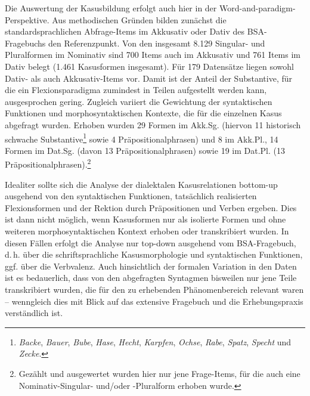 \begin{sloppypar}
Die Auswertung der Kasusbildung erfolgt auch hier in der Word-and-par\-a\-digm-Per\-spek\-ti\-ve. Aus methodischen Gründen bilden zunächst die standardsprachlichen Abfrage-Items im Akkusativ oder Dativ des BSA-Fragebuchs den Referenzpunkt. Von den insgesamt 8.129 Singular- und Pluralformen im Nominativ sind 700 Items auch im Akkusativ und 761 Items im Dativ belegt (1.461 Kasusformen insgesamt). Für 179 Datensätze liegen sowohl Dativ- als auch Akkusativ-Items vor. Damit ist der Anteil der Substantive, für die ein Flexionsparadigma zumindest in Teilen aufgestellt werden kann, ausgesprochen gering. Zugleich variiert die Gewichtung der syntaktischen Funktionen und morphosyntaktischen Kontexte, die für die einzelnen Kasus abgefragt wurden. Erhoben wurden 29 Formen im Akk.Sg. (hiervon 11 historisch schwache Substantive\footnote{\textit{Backe}, \textit{Bauer}, \textit{Bube}, \textit{Hase}, \textit{Hecht}, \textit{Karpfen}, \textit{Ochse}, \textit{Rabe}, \textit{Spatz}, \textit{Specht} und \textit{Zecke}.} sowie 4 Präpositionalphrasen) und 8 im Akk.Pl., 14 Formen im Dat.Sg. (davon 13 Präpositionalphrasen) sowie 19 im Dat.Pl. (13 Präpositionalphrasen).\footnote{Gezählt und ausgewertet wurden hier nur jene Frage-Items, für die auch eine Nominativ-Singular- und/oder
{}-Pluralform erhoben wurde.}
\end{sloppypar}

\begin{sloppypar}
Idealiter sollte sich die Analyse der dialektalen Kasusrelationen bottom-up ausgehend von den syntaktischen Funktionen, tatsächlich realisierten Flexionsformen und der Rektion durch Präpositionen und Verben ergeben. Dies ist dann nicht möglich, wenn Kasusformen nur als isolierte Formen und ohne weiteren morphosyntaktischen Kontext erhoben oder trans\-kri\-biert wurden. In diesen Fällen erfolgt die Analyse nur top-down ausgehend vom BSA-Fragebuch, d.\,h. über die schriftsprachliche Kasusmorphologie und syntaktischen Funktionen, ggf. über die Verb\-va\-lenz. Auch hinsichtlich der formalen Variation in den Daten ist es bedauerlich, dass von den abgefragten Syntagmen bisweilen nur jene Teile trans\-kri\-biert wurden, die für den zu erhebenden Phänomenbereich relevant waren -- wenngleich dies mit Blick auf das extensive Fragebuch und die Erhebungspraxis verständlich ist.
\end{sloppypar}

